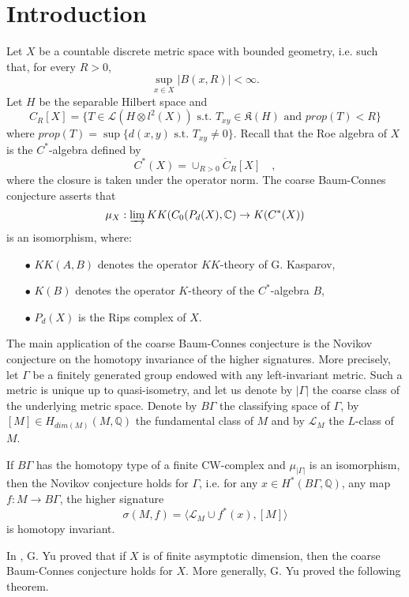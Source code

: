 \section{Introduction}

Let $X$ be a countable discrete metric space with bounded geometry, i.e. such that, for every $R>0$, 
\[\sup_{x\in X} |B(x,R)|<\infty.\] 
Let $H$ be the separable Hilbert space and 
\[C_R[X] = \{T\in \mathcal L(H\otimes l^2(X)) \text{ s.t. } T_{xy} \in \mathfrak K(H) \text{ and } prop(T) < R \}\]
where $prop(T) = \sup\{d(x,y) \text{ s.t. } T_{xy} \neq 0\}$. Recall that the Roe algebra of $X$ is the $C^*$-algebra defined by
\[C^*(X) = \overline{\cup_{R>0} C_R[X]}\quad ,\] 
where the closure is taken under the operator norm. The coarse Baum-Connes conjecture asserts that
\[\mu_X : \varinjlim KK(C_0(P_d(X),\mathbb C) \rightarrow K(C^*(X))\]
is an isomorphism, where:
\begin{itemize}
\item[$\bullet$] $KK(A,B)$ denotes the operator $KK$-theory of G. Kasparov,
\item[$\bullet$] $K(B)$ denotes the operator $K$-theory of the $C^*$-algebra $B$,
\item[$\bullet$] $P_d(X)$ is the Rips complex of $X$.
\end{itemize}

The main application of the coarse Baum-Connes conjecture is the Novikov conjecture on the homotopy invariance of the higher signatures. More precisely, let $\Gamma$ be a finitely generated 
group endowed with any left-invariant metric. Such a metric is unique up to quasi-isometry, and let us denote by $|\Gamma|$ the coarse class of the underlying metric space. Denote by $B \Gamma$ the classifying space of $\Gamma$, by $[M]\in H_{dim(M)}(M,\mathbb Q)$ the fundamental class of $M$ and by $\mathcal L_M$ the $L$-class of $M$.

\begin{thm}
If $B\Gamma$ has the homotopy type of a finite CW-complex and $\mu_{|\Gamma|}$ is an isomorphism, then the Novikov conjecture holds for $\Gamma$, i.e. for any $x\in H^*(B\Gamma,\mathbb Q)$, any map $f:M\rightarrow B  \Gamma $, the higher signature
\[ \sigma(M,f) = \langle \mathcal L_M\cup f^*(x) ,[M]\rangle\]
is homotopy invariant.
\end{thm}  

In \cite{Yu1}, G. Yu proved that if $X$ is of finite asymptotic dimension, then the coarse Baum-Connes conjecture holds for $X$. More generally, G. Yu proved the following theorem.

